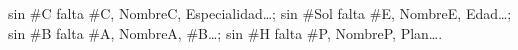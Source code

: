 sin \#C falta \#C, NombreC, Especialidad…; sin \#Sol falta \#E, NombreE, Edad…; sin \#B falta \#A, NombreA, \#B…; sin \#H falta \#P, NombreP, Plan….
